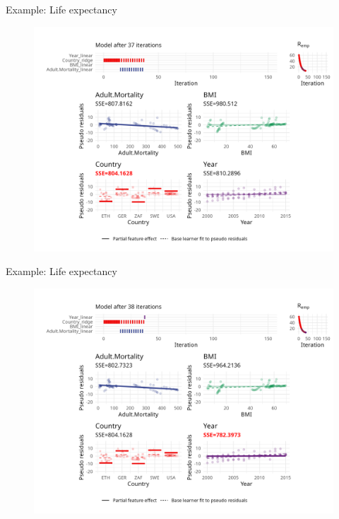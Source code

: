 \begin{frame}{Example: Life expectancy}
	\begin{figure}
		\centering
		\includegraphics[width=\textwidth]{figure/cwb-anim/fig-iter-0037.png}
	\end{figure}
	\addtocounter{framenumber}{-1}
\end{frame}


\begin{frame}{Example: Life expectancy}
	\begin{figure}
		\centering
		\includegraphics[width=\textwidth]{figure/cwb-anim/fig-iter-0038.png}
	\end{figure}
	\addtocounter{framenumber}{-1}
\end{frame}


